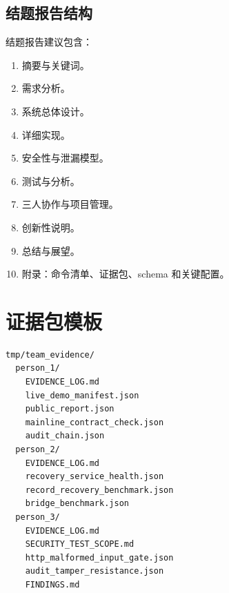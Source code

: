 \documentclass[UTF8,a4paper,12pt,oneside]{ctexrep}
\begin{document}
\section{结题报告结构}

结题报告建议包含：

\begin{enumerate}
  \item 摘要与关键词。
  \item 需求分析。
  \item 系统总体设计。
  \item 详细实现。
  \item 安全性与泄漏模型。
  \item 测试与分析。
  \item 三人协作与项目管理。
  \item 创新性说明。
  \item 总结与展望。
  \item 附录：命令清单、证据包、schema 和关键配置。
\end{enumerate}

\chapter{证据包模板}

\begin{lstlisting}
tmp/team_evidence/
  person_1/
    EVIDENCE_LOG.md
    live_demo_manifest.json
    public_report.json
    mainline_contract_check.json
    audit_chain.json
  person_2/
    EVIDENCE_LOG.md
    recovery_service_health.json
    record_recovery_benchmark.json
    bridge_benchmark.json
  person_3/
    EVIDENCE_LOG.md
    SECURITY_TEST_SCOPE.md
    http_malformed_input_gate.json
    audit_tamper_resistance.json
    FINDINGS.md
\end{lstlisting}
\end{document}
